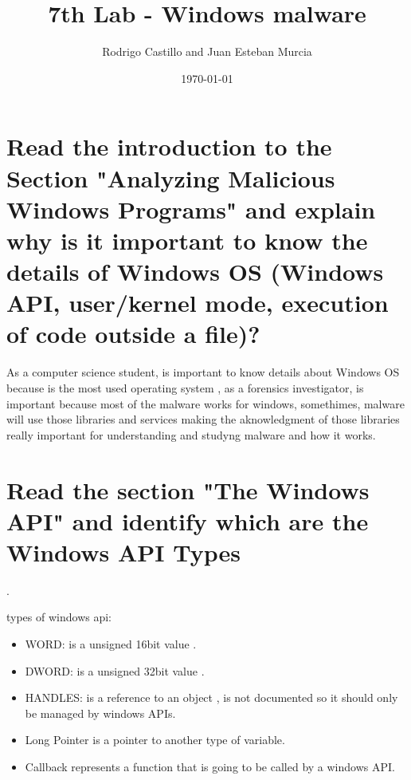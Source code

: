 \documentclass[10pt,a4paper]{article} %
\begin{document}
    \title{{  7th Lab - Windows malware  }}
    \author{{Rodrigo Castillo and Juan Esteban Murcia}}
    \date{\today}

    \maketitle


    \section{Read the introduction to the Section "Analyzing Malicious Windows
        Programs" and explain why is it important to know the details of Windows OS
        (Windows API, user/kernel mode, execution of code outside a file)?}

        As a computer science student, is important to know details about
        Windows OS because is the most used operating system , as a forensics
        investigator, is important because most of the malware works for
        windows, somethimes, malware will use those libraries and services
        making the aknowledgment of those libraries really important for
        understanding and studyng malware and how it works.

    \section{Read the section "The Windows API" and identify which are the
        Windows API Types}.

        types of windows api:
        \begin{itemize}
            \item {WORD:}
                is a unsigned 16bit value .
            \item {DWORD:}
                is a unsigned 32bit value .
            \item {HANDLES:}
                is a reference to an object , is not documented so it should
                only be managed by windows APIs.
            \item {Long Pointer}
                is a pointer to another type of variable.
            \item {Callback}
                represents a function that is going to be called by a windows
                API.
        \end{itemize}
\end{document}
